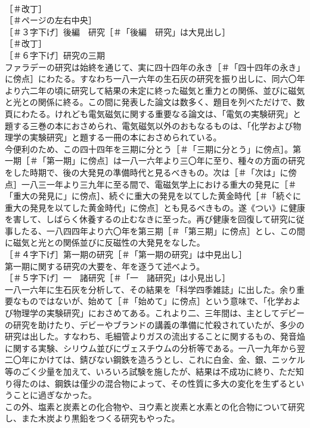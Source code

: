 \documentclass[8pt]{extreport}
\begin{document}
\begin{CJK}{UTF8}{min}
\\	［＃改丁］
\\	［＃ページの左右中央］
\\	［＃３字下げ］後編　研究［＃「後編　研究」は大見出し］
\\	［＃改丁］
\\	［＃６字下げ］研究の三期
\\	ファラデーの研究は始終を通じて、実に四十四年の永き［＃「四十四年の永き」に傍点］にわたる。すなわち一八一六年の生石灰の研究を振り出しに、同六〇年より六二年の頃に研究して結果の未定に終った磁気と重力との関係、並びに磁気と光との関係に終る。この間に発表した論文は数多く、題目を列べただけで、数頁にわたる。けれども電気磁気に関する重要なる論文は、「電気の実験研究」と題する三巻の本におさめられ、電気磁気以外のおもなるものは、「化学および物理学の実験研究」と題する一冊の本におさめられている。
\\	今便利のため、この四十四年を三期に分とう［＃「三期に分とう」に傍点］。第一期［＃「第一期」に傍点］は一八一六年より三〇年に至り、種々の方面の研究をした時期で、後の大発見の準備時代と見るべきもの。次は［＃「次は」に傍点］一八三一年より三九年に至る間で、電磁気学上における重大の発見に［＃「重大の発見に」に傍点］、続ぐに重大の発見を以てした黄金時代［＃「続ぐに重大の発見を以てした黄金時代」に傍点］とも見るべきもの。遂《つい》に健康を害して、しばらく休養するの止むなきに至った。再び健康を回復して研究に従事したる、一八四四年より六〇年を第三期［＃「第三期」に傍点］とし、この間に磁気と光との関係並びに反磁性の大発見をなした。
\\	［＃４字下げ］第一期の研究［＃「第一期の研究」は中見出し］
\\	第一期に関する研究の大要を、年を逐うて述べよう。
\\	［＃５字下げ］一　諸研究［＃「一　諸研究」は小見出し］
\\	一八一六年に生石灰を分析して、その結果を「科学四季雑誌」に出した。余り重要なものではないが、始めて［＃「始めて」に傍点］という意味で、「化学および物理学の実験研究」におさめてある。これより二、三年間は、主としてデビーの研究を助けたり、デビーやブランドの講義の準備に忙殺されていたが、多少の研究は出した。すなわち、毛細管よりガスの流出することに関するもの、発音焔に関する実験、シリウム並びにヴェスチウムの分析等である。一八一九年から翌二〇年にかけては、錆びない鋼鉄を造ろうとし、これに白金、金、銀、ニッケル等のごく少量を加えて、いろいろ試験を施したが、結果は不成功に終り、ただ知り得たのは、鋼鉄は僅少の混合物によって、その性質に多大の変化を生ずるということに過ぎなかった。
\\	この外、塩素と炭素との化合物や、ヨウ素と炭素と水素との化合物について研究し、また木炭より黒鉛をつくる研究もやった。

\end{CJK}
\end{document}
